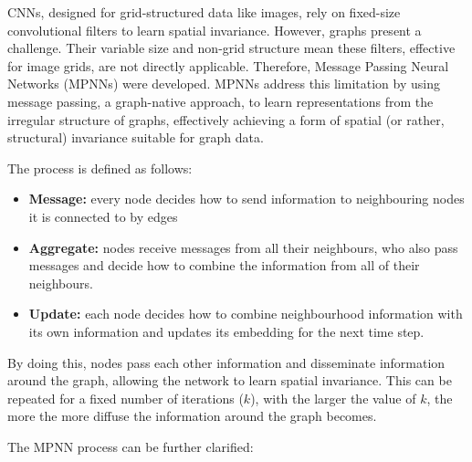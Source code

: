 \documentclass[10pt,oneside]{book}
\begin{document}
\begin{tcolorbox}[title=Message Passing Neural Networks in GNNs]  
\small
    CNNs, designed for grid-structured data like images, rely on fixed-size convolutional filters to learn spatial invariance. However, graphs present a challenge. Their variable size and non-grid structure mean these filters, effective for image grids, are not directly applicable. Therefore, Message Passing Neural Networks (MPNNs) were developed. MPNNs address this limitation by using message passing, a graph-native approach, to learn representations from the irregular structure of graphs, effectively achieving a form of spatial (or rather, structural) invariance suitable for graph data.

    The process is defined as follows:
    \begin{itemize}
        \item {\bf{Message:}} every node decides how to send information to neighbouring nodes it is connected to by edges
        \item {\bf{Aggregate:}} nodes receive messages from all their neighbours, who also pass messages and decide how to combine the information from all of their neighbours. 
        \item {\bf{Update:}} each node decides how to combine neighbourhood information with its own information and updates its embedding for the next time step. 
    \end{itemize}

    By doing this, nodes pass each other information and disseminate information around the graph, allowing the network to learn spatial invariance.  This can be repeated for a fixed number of iterations ($k$), with the larger the value of $k$, the more the more diffuse the information around the graph becomes.

    The MPNN process can be further clarified:


\end{tcolorbox}
\end{document}
